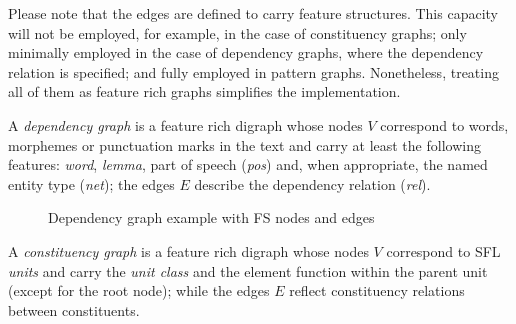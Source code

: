 Please note that the edges are defined to carry feature structures. This capacity will not be employed, for example, in the case of constituency graphs; only minimally employed in the case of dependency graphs, where the dependency relation is specified; and fully employed in pattern graphs. Nonetheless, treating all of them as feature rich graphs simplifies the implementation.

\begin{definition}\label{def:dep-graph}
	A \textit{dependency graph} is a feature rich digraph whose nodes $V$ correspond to words, morphemes or punctuation marks in the text and carry at least the following features: \textit{word}, \textit{lemma}, part of speech (\textit{pos}) and, when appropriate, the named entity type (\textit{net}); the edges $E$ describe the dependency relation (\textit{rel}).
\end{definition}

\begin{figure}[!ht]
\centering
{}
\caption{Dependency graph example with FS nodes and edges}
\label{fig:dep-graph}
\end{figure}


\begin{definition}\label{def:constituency-graph}
	A \textit{constituency graph} is a feature rich digraph whose nodes $V$ correspond to SFL \textit{units} and carry the \textit{unit class} and the element function within the parent unit (except for the root node); while the edges $E$ reflect constituency relations between constituents. 
\end{definition}

